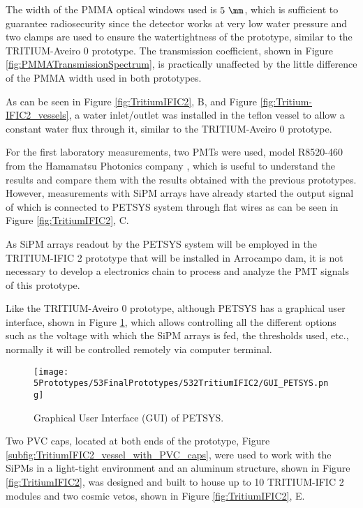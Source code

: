 The width of the PMMA optical windows used is $5~\mm$, which is sufficient to guarantee radiosecurity since the detector works at very low water pressure and two clamps are used to ensure the watertightness of the prototype, similar to the TRITIUM-Aveiro 0 prototype. The transmission coefficient, shown in Figure \ref{fig:PMMATransmissionSpectrum}, is practically unaffected by the little difference of the PMMA width used in both prototypes.

As can be seen in Figure \ref{fig:TritiumIFIC2}, B, and Figure \ref{fig:Tritium-IFIC2_vessels}, a water inlet/outlet was installed in the teflon vessel to allow a constant water flux through it, similar to the TRITIUM-Aveiro 0 prototype.

For the first laboratory measurements, two PMTs were used, model R8520-460 from the Hamamatsu Photonics company \cite{DataSheetPMTs}, which is useful to understand the results and compare them with the results obtained with the previous prototypes. However, measurements with SiPM arrays have already started the output signal of which is connected to PETSYS system through flat wires as can be seen in Figure \ref{fig:TritiumIFIC2}, C.

As SiPM arrays readout by the PETSYS system will be employed in the TRITIUM-IFIC 2 prototype that will be installed in Arrocampo dam, it is not necessary to develop a electronics chain to process and analyze the PMT signals of this prototype.

Like the TRITIUM-Aveiro 0 prototype, although PETSYS has a graphical user interface, shown in Figure \ref{fig:GUI_PETSYS}, which allows controlling all the different options such as the voltage with which the SiPM arrays is fed, the thresholds used, etc., normally it will be controlled remotely via computer terminal. 

\begin{figure}[h]
\centering
\texttt{[image: 5Prototypes/53FinalPrototypes/532TritiumIFIC2/GUI\_PETSYS.png]}
\caption{Graphical User Interface (GUI) of PETSYS.\label{fig:GUI_PETSYS}}
\end{figure}

Two PVC caps, located at both ends of the prototype, Figure \ref{subfig:TritiumIFIC2_vessel_with_PVC_caps}, were used to work with the SiPMs in a light-tight environment and an aluminum structure, shown in Figure \ref{fig:TritiumIFIC2}, was designed and built to house up to 10 TRITIUM-IFIC 2 modules and two cosmic vetos, shown in Figure \ref{fig:TritiumIFIC2}, E.

